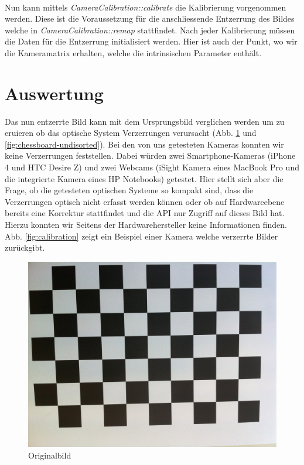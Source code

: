 \paragraph{} Nun kann mittels \textit{CameraCalibration::calibrate} die Kalibrierung vorgenommen werden. Diese ist die Voraussetzung für die anschliessende Entzerrung des Bildes welche in \textit{CameraCalibration::remap} stattfindet. Nach jeder Kalibrierung müssen die Daten für die Entzerrung initialisiert werden. Hier ist auch der Punkt, wo wir die Kameramatrix erhalten, welche die intrinsischen Parameter enthält.

\section{Auswertung} Das nun entzerrte Bild kann mit dem Ursprungsbild verglichen werden um zu eruieren ob das optische System Verzerrungen verursacht (Abb. \ref{fig:chessboard-disorted} und \ref{fig:chessboard-undisorted}). Bei den von uns getesteten Kameras konnten wir keine Verzerrungen feststellen. Dabei würden zwei Smartphone-Kameras (iPhone 4 und HTC Desire Z) und zwei Webcams (iSight Kamera eines MacBook Pro und die integrierte Kamera eines HP Notebooks) getestet. Hier stellt sich aber die Frage, ob die getesteten optischen Systeme so kompakt sind, dass die Verzerrungen optisch nicht erfasst werden können oder ob auf Hardwareebene bereits eine Korrektur stattfindet und die API nur Zugriff auf dieses Bild hat. Hierzu konnten wir Seitens der Hardwarehersteller keine Informationen finden. Abb. \ref{fig:calibration} zeigt ein Beispiel einer Kamera welche verzerrte Bilder zurückgibt.

\begin{figure}[!ht]
\centering
\includegraphics[scale=0.1]{images/chessboard-disorted.jpg} 
\caption{Originalbild}
\label{fig:chessboard-disorted}
\end{figure}

